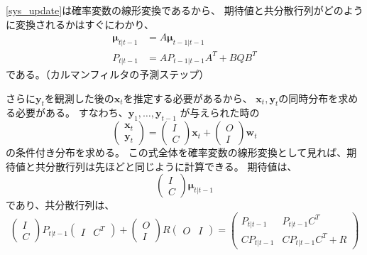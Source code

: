 \documentclass[textwidth-limit=45]{bxjsarticle}
\begin{document}
\eqref{sys_update}は確率変数の線形変換であるから、
期待値と共分散行列がどのように変換されるかはすぐにわかり、
\begin{align}
  \bm \mu_{t|t-1} &= A \bm \mu_{t-1|t-1} \\
  P_{t|t-1} &= A P_{t-1|t-1} A^T + B Q B^T
\end{align}
である。（カルマンフィルタの予測ステップ）

さらに$\bm y_t$を観測した後の$\bm x_t$を推定する必要があるから、
$\bm x_t, \bm y_t$の同時分布を求める必要がある。
すなわち、$\bm y_1, \dots, \bm y_{t-1}$ が与えられた時の
\begin{equation}
  \begin{pmatrix}
    \bm x_t \\
    \bm y_t
  \end{pmatrix} =
  \begin{pmatrix}
    I \\
    C
  \end{pmatrix} \bm x_t +
  \begin{pmatrix}
    O \\
    I
  \end{pmatrix} \bm w_t
\end{equation}
の条件付き分布を求める。
この式全体を確率変数の線形変換として見れば、期待値と共分散行列は先ほどと同じように計算できる。
期待値は、
\begin{equation}
  \begin{pmatrix}
    I \\
    C
  \end{pmatrix} \bm \mu_{t|t-1}
\end{equation}
であり、共分散行列は、
\begin{equation}
  \begin{pmatrix}
    I \\
    C
  \end{pmatrix} P_{t|t-1}
  \begin{pmatrix}
    I & C^T
  \end{pmatrix} + 
  \begin{pmatrix}
    O \\
    I
  \end{pmatrix} R
  \begin{pmatrix}
    O & I
  \end{pmatrix} =
  \begin{pmatrix}
    P_{t|t-1} & P_{t|t-1} C^T \\
    C P_{t|t-1} & C P_{t|t-1} C^T + R
  \end{pmatrix}
\end{equation}
\end{document}
